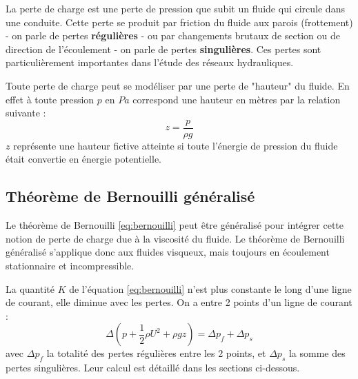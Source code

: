 La perte de charge est une perte de pression que subit un fluide qui circule dans une conduite. Cette perte se produit par friction du fluide aux parois (frottement) - on parle de pertes \textbf{régulières} - ou par changements brutaux de section ou de direction de l'écoulement - on parle de pertes \textbf{singulières}. Ces pertes sont particulièrement importantes dans l'étude des réseaux hydrauliques.

Toute perte de charge peut se modéliser par une perte de "hauteur" du fluide. En effet à toute pression $p$ en $Pa$ correspond une hauteur en mètres par la relation suivante :
%
\begin{equation}
z = \frac{p}{\rho g}
\end{equation}
%
$z$ représente une hauteur fictive atteinte si toute l'énergie de pression du fluide était convertie en énergie potentielle.

\subsection{Théorème de Bernouilli généralisé}

Le théorème de Bernouilli \eqref{eq:bernouilli} peut être généralisé pour intégrer cette notion de perte de charge due à la viscosité du fluide. Le théorème de Bernouilli généralisé s'applique donc aux fluides visqueux, mais toujours en écoulement stationnaire et incompressible.

La quantité $K$ de l'équation \eqref{eq:bernouilli} n'est plus constante le long d'une ligne de courant, elle diminue avec les pertes. On a entre 2 points d'un ligne de courant :
%
\begin{equation}
\Delta \left( p + \frac{1}{2}\rho U^2 + \rho g z \right) = \Delta p_f + \Delta p_s
\end{equation}
%
avec $\Delta p_f$ la totalité des pertes régulières entre les 2 points, et $\Delta p_s$ la somme des pertes singulières. Leur calcul est détaillé dans les sections ci-dessous.

